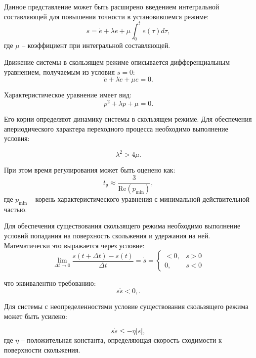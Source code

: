 Данное представление может быть расширено введением интегральной
составляющей для повышения точности в установившемся режиме:
\begin{equation*}
	s = \dot{e} + \lambda e + \mu\int_0^t e(\tau)d\tau,
\end{equation*}
где $\mu$ -- коэффициент при интегральной составляющей.

Движение системы в скользящем режиме описывается дифференциальным уравнением, получаемым из условия $s = 0$:
\begin{equation*}
	\ddot{e} + \lambda\dot{e} + \mu e = 0.
\end{equation*}

Характеристическое уравнение имеет вид:
\begin{equation*}
	p^2 + \lambda p + \mu = 0.
\end{equation*}

Его корни определяют динамику системы в скользящем режиме. Для обеспечения
апериодического характера переходного процесса необходимо выполнение условия:

\begin{equation*}
	\lambda^2 > 4\mu.
\end{equation*}

При этом время регулирования может быть оценено как:
\begin{equation*}
	t_\text{р} \approx \frac{3}{\text{Re}(p_\text{min})},
\end{equation*}
где $p_\text{min}$ -- корень характеристического уравнения с минимальной действительной частью.

Для обеспечения существования скользящего режима необходимо выполнение условий
попадания на поверхность скольжения и удержания на ней. Математически это выражается через условие:
\begin{equation*}
	\lim_{\Delta t \to 0} \frac{s(t + \Delta t) - s(t)}{\Delta t} = \dot{s} = \begin{cases}
		< 0, & s > 0 \\
		0,   & s < 0
	\end{cases}
\end{equation*}

что эквивалентно требованию:
\begin{equation*}
	s\dot{s} < 0,.
\end{equation*}

Для системы с неопределенностями условие существования скользящего режима может быть усилено:

\begin{equation*}
	s\dot{s} \leq -\eta|s|,
\end{equation*}
где $\eta$ -- положительная константа, определяющая скорость сходимости к поверхности скольжения.

